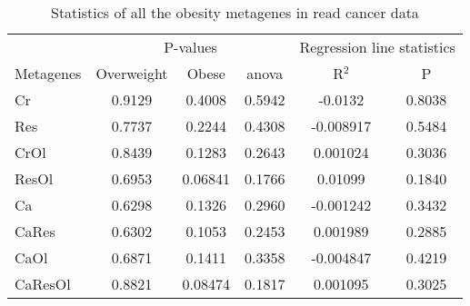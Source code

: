 \begin{appendices}
\begin{table}[htpb]
	\centering
	\caption{Statistics of all the obesity metagenes in \gls{read} cancer data}
	\label{tab:degmetaread}
	\begin{threeparttable}
		\begin{tabular}{lccccc}
			& \multicolumn{3}{c}{ P-values} & \multicolumn{2}{c}{ Regression line statistics}\\
			\cmidrule(r){2-4} \cmidrule(r){5-6}
			Metagenes &  Overweight &  Obese &  \gls{anova} &  R$^2$ &  P \\
			\hline
			\hline
			\rule{0pt}{2.25ex}Cr      & 0.9129                      & 0.4008  & 0.5942             & -0.0132    & 0.8038              \\
            Res     & 0.7737                      & 0.2244  & 0.4308             & -0.008917  & 0.5484              \\
            CrOl    & 0.8439                      & 0.1283  & 0.2643             & 0.001024   & 0.3036              \\
            ResOl   & 0.6953                      & 0.06841 & 0.1766             & 0.01099    & 0.1840              \\
            Ca      & 0.6298                      & 0.1326  & 0.2960             & -0.001242  & 0.3432              \\
            CaRes   & 0.6302                      & 0.1053  & 0.2453             & 0.001989   & 0.2885              \\
            CaOl    & 0.6871                      & 0.1411  & 0.3358             & -0.004847  & 0.4219              \\
            CaResOl & 0.8821                      & 0.08474 & 0.1817             & 0.001095   & 0.3025              \\
			\hline
			\hline
		\end{tabular}
	\end{threeparttable}
\end{table}


\end{appendices}
